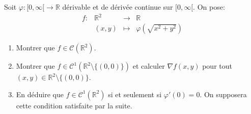 \documentclass[a4paper]{tp_um}
\begin{document}
\exo{}
Soit $\varphi : [0,\infty[ \to \mathbb R$ d\'erivable et de d\'eriv\'ee continue sur $[0,\infty[$. 
On pose:
\[
\begin{array}{rrcl}
f  : & \mathbb R^2 & \longrightarrow & \mathbb R  \\
		& (x,y) & \longmapsto & \varphi(\sqrt{x^2+y^2})
\end{array}
\]
\begin{enumerate}
\item Montrer que $f \in \mathcal C(\mathbb R^2)$.




\item Montrer que $f \in \mathcal C^1(\mathbb R^2 \setminus \{(0,0)\})$ et calculer $\nabla f(x,y)$
pour tout $(x,y) \in \mathbb R^2 \setminus \{(0,0)\}$.



\item En d\'eduire que $f \in \mathcal C^{1}(\mathbb R^2)$  si et seulement si $\varphi'(0) = 0.$
On supposera cette condition satisfaite par la suite.




\end{enumerate}
\end{document}
